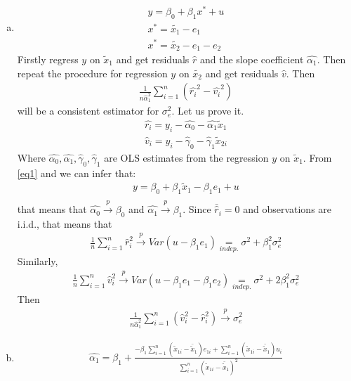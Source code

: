 \documentclass[a4paper]{article}
\newcommand{\summa}{\sum_{i=1}^n}
\begin{document}
\begin{enumerate}[(a)]
	\item \begin{align}
	y = \beta_0 + \beta_1 x^* + u\nonumber\\
	x^* = \tilde{x_1} - e_1\label{eq1}\\
	x^* = \tilde{x_2} - e_1 - e_2\label{eq2}
	\end{align}
	Firstly regress $y$ on $\tilde{x}_1$ and get residuals $\hat{r}$ and the slope coefficient $\hat{\alpha_1}$. Then repeat the procedure for regression $y$ on $\tilde{x_2}$ and get residuals $\hat{v}$. Then 
	\begin{align*}
	\frac{1}{n \hat{\alpha}_1^2} \summa (\hat{r_i}^2 - \hat{v_i}^2)
	\end{align*}
	will be a consistent estimator for $\sigma^2_e$. Let us prove it.
	\begin{align*}
	\hat{r_{i}} = y_i - \hat{\alpha_0} - \hat{\alpha_1}\tilde{x}_1\\
	\hat{v}_i = y_i - \hat{\gamma}_0 - \hat{\gamma}_1 \tilde{x}_{2i}
	\end{align*}
	Where $\hat{\alpha_0}, \hat{\alpha_1}, \hat{\gamma}_0, \hat{\gamma}_1$ are OLS estimates from the regression $y$ on $\tilde{x}_1$. From \eqref{eq1} and we can infer that:
	\begin{align*}
	y = \beta_0 + \beta_1 \tilde{x}_1 - \beta_1 e_1 + u\\
	\end{align*}
	that means that $\hat{\alpha_0} \overset{p}{\to} \beta_0$ and $\hat{\alpha_1} \overset{p}{\to} \beta_1$. Since $\bar{\hat{r}}_i = 0$ and observations are i.i.d., that means that
	\begin{align*}
	\frac{1}{n} \summa \hat{r}_i^2 \overset{p}{\to} Var(u - \beta_1 e_1) \underset{indep.}{=} \sigma^2 + \beta_1^2 \sigma^2_e
	\end{align*}
	Similarly,
	\begin{align*}
	\frac{1}{n} \summa \hat{v}_i^2 \overset{p}{\to} Var(u - \beta_1 e_1 - \beta_1 e_2) \underset{indep.}{=} \sigma^2 + 2\beta_1^2 \sigma^2_e
	\end{align*}
	Then
	\begin{align*}
	\frac{1}{n \hat{\alpha}_1^2}\summa(\hat{v}_i^2 - \hat{r}_i^2) \overset{p}{\to} \sigma^2_e
	\end{align*}
	\item 
	\begin{align*}
	\hat{\alpha_1} = \beta_1 + \frac{-\beta_1 \summa (\tilde{x}_{1i} - \bar{\tilde{x}}_1)e_{1i} + \summa(\tilde{x}_{1i} - \bar{\tilde{x}}_1)u_{i} }{\summa (\tilde{x}_{1i} - \bar{\tilde{x}}_1)^2}

\end{align*}
\end{enumerate}
\end{document}
